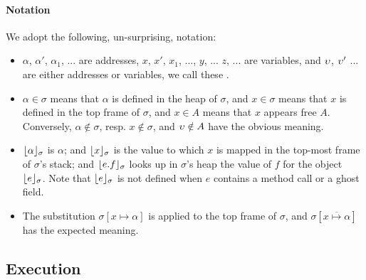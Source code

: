 \paragraph{Notation} We adopt the following, un-surprising, notation:
\begin{itemize}
\item
$\alpha$, $\alpha'$, $\alpha_1$, ... are addresses,   $x$, $x'$, $x_1$, ..., $y$, ... $z$, ... are variables, and $\upsilon$, $\upsilon'$ ... are either addresses or variables, we call these \emph{\atoms}.
\item
$\alpha \in \sigma$ means that $\alpha$ is defined in the heap of $\sigma$, and $x\in \sigma$ means that $x$ is defined in the top frame of $\sigma$, and $x\in A$ means that $x$ appears free $A$. Conversely, %
 $\alpha\notin\sigma$, resp. $x\notin\sigma$, and $\upsilon \notin A$ have the obvious meaning.
\item
$\lfloor \alpha \rfloor_{\sigma}$  is $\alpha$; and $\lfloor x \rfloor_{\sigma}$  is the value to which  $x$  is mapped in the top-most frame of $\sigma$'s stack; 
and $\lfloor e.f \rfloor_{\sigma}$ looks up in $\sigma$'s heap the value of $f$ for the object  $\lfloor e \rfloor_{\sigma}$.
Note that $\lfloor e \rfloor_{\sigma}$ is not defined when $e$ contains a method call or a ghost field.
\item The substitution  $\sigma[x \mapsto \alpha]$ is applied to the top frame of $\sigma$, and $\sigma[\overline{x \mapsto \alpha}]$ %
has the expected meaning.
\end{itemize}

  

  
\subsection{\LangOO Execution }
\label{sect:execution}
 
